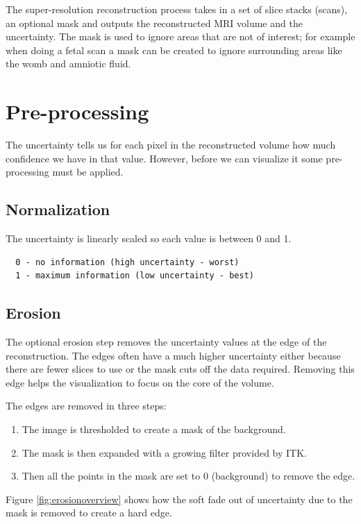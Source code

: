 The super-resolution reconstruction process takes in a set of slice stacks (scans), an optional mask and outputs the reconstructed MRI volume and the uncertainty. The mask is used to ignore areas that are not of interest; for example when doing a fetal scan a mask can be created to ignore surrounding areas like the womb and amniotic fluid.

\section{Pre-processing}\label{section:preprocessing}
The uncertainty tells us for each pixel in the reconstructed volume how much confidence we have in that value. However, before we can visualize it some pre-processing must be applied. 

\subsection*{Normalization}
The uncertainty is linearly scaled so each value is between 0 and 1.

\begin{verbatim}
  0 - no information (high uncertainty - worst)
  1 - maximum information (low uncertainty - best)
\end{verbatim}

\subsection*{Erosion}
The optional erosion step removes the uncertainty values at the edge of the reconstruction. The edges often have a much higher uncertainty either because there are fewer slices to use or the mask cuts off the data required. Removing this edge helps the visualization to focus on the core of the volume.

The edges are removed in three steps:

\begin{enumerate}
  \item The image is thresholded to create a mask of the background.
  \item The mask is then expanded with a growing filter provided by ITK.
  \item Then all the points in the mask are set to 0 (background) to remove the edge.
\end{enumerate}

Figure \ref{fig:erosionoverview} shows how the soft fade out of uncertainty due to the mask is removed to create a hard edge.


